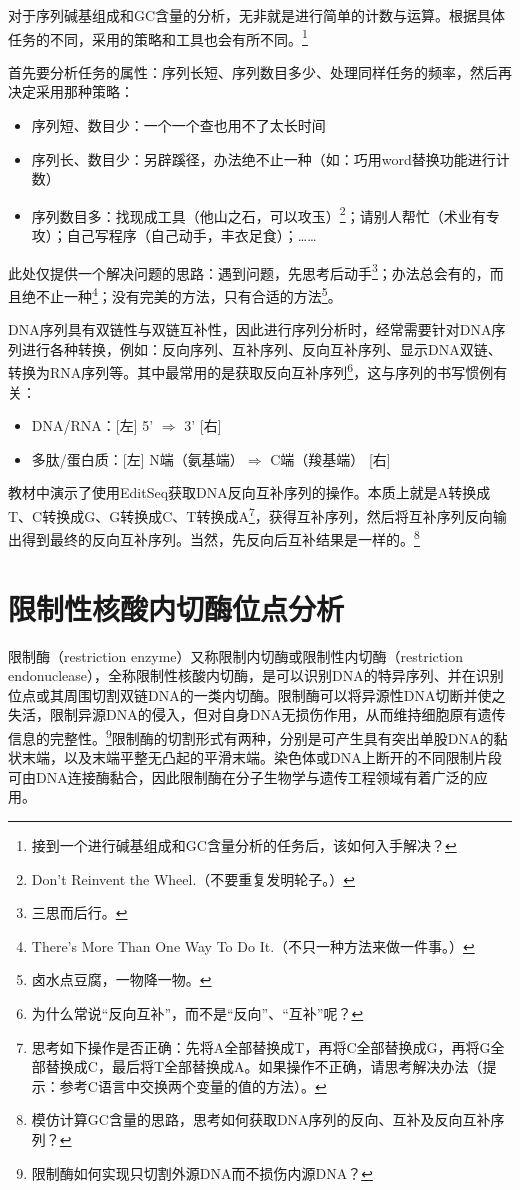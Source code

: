 \documentclass[11pt,a4paper,twoside]{book}
\begin{document}
对于序列碱基组成和GC含量的分析，无非就是进行简单的计数与运算。根据具体任务的不同，采用的策略和工具也会有所不同。\footnote{接到一个进行碱基组成和GC含量分析的任务后，该如何入手解决？}

首先要分析任务的属性：序列长短、序列数目多少、处理同样任务的频率，然后再决定采用那种策略：
\begin{itemize}
  \item 序列短、数目少：一个一个查也用不了太长时间
  \item 序列长、数目少：另辟蹊径，办法绝不止一种（如：巧用word替换功能进行计数）
  \item 序列数目多：找现成工具（他山之石，可以攻玉）\footnote{Don't Reinvent the Wheel.（不要重复发明轮子。）}；请别人帮忙（术业有专攻）；自己写程序（自己动手，丰衣足食）；……
\end{itemize}

此处仅提供一个解决问题的思路：遇到问题，先思考后动手\footnote{三思而后行。}；办法总会有的，而且绝不止一种\footnote{There's More Than One Way To Do It.（不只一种方法来做一件事。）}；没有完美的方法，只有合适的方法\footnote{卤水点豆腐，一物降一物。}。

DNA序列具有双链性与双链互补性，因此进行序列分析时，经常需要针对DNA序列进行各种转换，例如：反向序列、互补序列、反向互补序列、显示DNA双链、转换为RNA序列等。其中最常用的是获取反向互补序列\footnote{为什么常说“反向互补”，而不是“反向”、“互补”呢？}，这与序列的书写惯例有关：
\begin{itemize}
  \item DNA/RNA：[左] 5' $\Longrightarrow$ 3' [右]
  \item 多肽/蛋白质：[左] N端（氨基端）$\Longrightarrow$ C端（羧基端） [右]
\end{itemize}

教材中演示了使用EditSeq获取DNA反向互补序列的操作。本质上就是A转换成T、C转换成G、G转换成C、T转换成A\footnote{思考如下操作是否正确：先将A全部替换成T，再将C全部替换成G，再将G全部替换成C，最后将T全部替换成A。如果操作不正确，请思考解决办法（提示：参考C语言中交换两个变量的值的方法）。}，获得互补序列，然后将互补序列反向输出得到最终的反向互补序列。当然，先反向后互补结果是一样的。\footnote{模仿计算GC含量的思路，思考如何获取DNA序列的反向、互补及反向互补序列？}

\section{限制性核酸内切酶位点分析}
限制酶（restriction enzyme）又称限制内切酶或限制性内切酶（restriction endonuclease），全称限制性核酸内切酶，是可以识别DNA的特异序列、并在识别位点或其周围切割双链DNA的一类内切酶。限制酶可以将异源性DNA切断并使之失活，限制异源DNA的侵入，但对自身DNA无损伤作用，从而维持细胞原有遗传信息的完整性。\footnote{限制酶如何实现只切割外源DNA而不损伤内源DNA？}限制酶的切割形式有两种，分别是可产生具有突出单股DNA的黏状末端，以及末端平整无凸起的平滑末端。染色体或DNA上断开的不同限制片段可由DNA连接酶黏合，因此限制酶在分子生物学与遗传工程领域有着广泛的应用。
\end{document}
